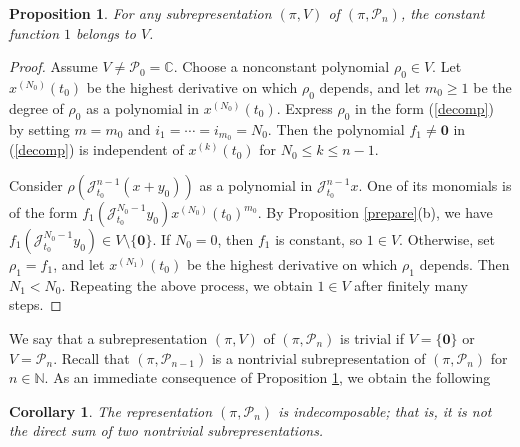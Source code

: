 \documentclass[11pt]{amsart}
\numberwithin{equation}{section}
\newcommand{\di}{\displaystyle}
\newtheorem{prop}[thm]{Proposition}
\newtheorem{cor}[thm]{Corollary}
\newcommand{\bc}{\mathbb{C}}
\newcommand{\bn}{\mathbb{N}}
\newcommand{\scp}{\mathscr{P}}
\newcommand{\sjt}{\mathscr{J}_{t_0}}
\newcommand{\sjm}{\mathscr{J}^{n-1}_{t_0}}
\newcommand{\sjmx}{\mathscr{J}^{n-1}_{t_0} x}
\newcommand{\pn}{\mathscr{P}_{n}}
\newcommand{\zero}{\mathbf{0}}
\begin{document}
\begin{prop} \label{1}
   For any subrepresentation $(\pi,V)$ of $(\pi,\pn)$, the constant function $1$ belongs to $V$.
\end{prop}
\begin{proof}
  Assume $V \neq \scp_0 = \bc$. Choose a nonconstant polynomial $\rho_0 \in V$. Let $x^{(N_0)}(t_0)$ be the highest derivative on which $\rho_0$ depends, and let $m_0 \ge 1$ be the degree of $\rho_0$ as a polynomial in $x^{(N_0)}(t_0)$. Express $\rho_0$ in the form (\ref{decomp}) by setting $m=m_0$ and $i_1=\cdots=i_{m_0}=N_0$. Then the polynomial $f_1 \not=\zero$ in (\ref{decomp}) is independent of $x^{(k)}(t_0)$ for $N_0 \le k \le n-1$.

Consider $\di \rho(\sjm(x+y_0))$ as a polynomial in $\di \sjmx$. One of its monomials is of the form
$f_1(\sjt^{N_0-1}y_0) x^{(N_0)}(t_0)^{m_0}$.
By Proposition \ref{prepare}(b), we have $f_1(\sjt^{N_0-1} y_0) \in V \setminus \{\zero\}$.
If $N_0=0$, then $f_1$ is constant, so $1 \in V$.
Otherwise, set $\rho_1=f_1$, and let $x^{(N_1)}(t_0)$ be the highest derivative on which $\rho_1$ depends. Then $N_1<N_0$. Repeating the above process, we obtain $1 \in V$ after finitely many steps.
\end{proof}

We say that a subrepresentation $(\pi, V)$ of $(\pi, \pn)$ is trivial if $V=\{\mathbf{0}\}$ or $V=\pn$.
Recall that $(\pi, \scp_{n-1})$ is a nontrivial subrepresentation of $(\pi, \pn)$ for $n \in \bn$.
As an immediate consequence of Proposition \ref{1}, we obtain the following

\begin{cor} \label{inde}
  The representation $(\pi, \pn)$ is indecomposable; that is, it is not the direct sum of two nontrivial subrepresentations.
\end{cor}
\end{document}
